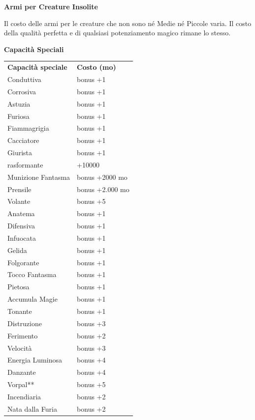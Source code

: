 \documentclass[a4paper,11pt,twoside,openany]{book}
\begin{document}
\textbf{Armi per Creature Insolite}

Il costo delle armi per le creature che non sono né Medie né Piccole varia. Il costo della qualità perfetta e di qualsiasi potenziamento
magico rimane lo stesso.

\bigskip

\textbf{Capacità Speciali}

\bigskip

\begin{tabular}{ll}
	\toprule
	\textbf{Capacità speciale}                    & \textbf{Costo (mo)}\tabularnewline
	Conduttiva \index{Conduttiva}                 & bonus +1\tabularnewline
	Corrosiva\index{Corrosiva}                    & bonus +1\tabularnewline
	Astuzia \index{Astuzia}                       & bonus +1\tabularnewline
	Furiosa \index{Furiosa}                       & bonus +1\tabularnewline
	Fiammagrigia \index{Fiammagrigia}             & bonus +1\tabularnewline
	Cacciatore \index{Cacciatore}                 & bonus +1\tabularnewline
	Giurista \index{Giurista}                     & bonus +1\tabularnewline
	rasformante \index{Trasformante}              & +10000\tabularnewline
	Munizione Fantasma \index{Munizione Fantasma} & bonus +2000 mo\tabularnewline
	Prensile \index{Prensile}                     & bonus +2.000 mo\tabularnewline
	Volante \index{Volante}                       & bonus +5\tabularnewline
	Anatema\index{Anatema}                        & bonus +1\tabularnewline
	Difensiva\index{Difensiva}                    & bonus +1\tabularnewline
	Infuocata \index{Infuocata}                   & bonus +1\tabularnewline
	Gelida \index{Gelida}                         & bonus +1\tabularnewline
	Folgorante \index{Folgorante}                 & bonus +1\tabularnewline
	Tocco Fantasma \index{Tocco Fantasma}         & bonus +1\tabularnewline
	Pietosa \index{Pietosa}                       & bonus +1\tabularnewline
	Accumula Magie \index{Accumula Magie}         & bonus +1\tabularnewline
	Tonante \index{Tonante}                       & bonus +1\tabularnewline
	Distruzione \index{Distruzione}               & bonus +3\tabularnewline
	Ferimento \index{Ferimento}                   & bonus +2\tabularnewline
	Velocità \index{Velocita'}                    & bonus +3\tabularnewline
	Energia Luminosa \index{Energia Luminosa}     & bonus +4\tabularnewline
	Danzante \index{Danzante}                     & bonus +4\tabularnewline
	Vorpal** \index{Vorpal}                       & bonus +5\tabularnewline
	Incendiaria \index{Incendiaria}               & bonus +2\tabularnewline
	Nata dalla Furia \index{Nata dalla Furia}     & bonus +2\tabularnewline
\end{tabular}
\end{document}
